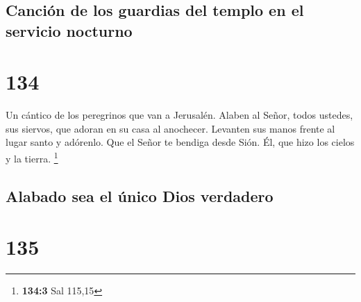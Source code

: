 \hypertarget{canciuxf3n-de-los-guardias-del-templo-en-el-servicio-nocturno}{%
\subsection{Canción de los guardias del templo en el servicio
nocturno}\label{canciuxf3n-de-los-guardias-del-templo-en-el-servicio-nocturno}}

\hypertarget{section-133}{%
\section{134}\label{section-133}}

Un cántico de los peregrinos que van a Jerusalén.  Alaben al
Señor, todos ustedes, sus siervos, que adoran en su casa al anochecer.
 Levanten sus manos frente al lugar santo y adórenlo.
 Que el Señor te bendiga desde Sión. Él, que hizo los cielos
y la tierra. \footnote{\textbf{134:3} Sal 115,15}

\hypertarget{alabado-sea-el-uxfanico-dios-verdadero}{%
\subsection{Alabado sea el único Dios
verdadero}\label{alabado-sea-el-uxfanico-dios-verdadero}}

\hypertarget{section-134}{%
\section{135}\label{section-134}}

